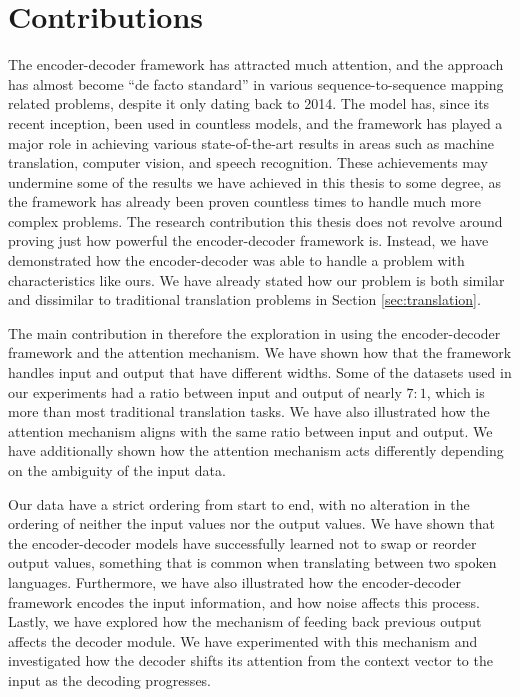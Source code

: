 
\section{Contributions}
\label{sec:contributions_final}
The encoder-decoder framework has attracted much attention, and the approach has almost become ``de facto standard'' in various sequence-to-sequence mapping related problems, despite it only dating back to 2014. The model has, since its recent inception, been used in countless models, and the framework has played a major role in achieving various state-of-the-art results in areas such as machine translation, computer vision, and speech recognition. These achievements may undermine some of the results we have achieved in this thesis to some degree, as the framework has already been proven countless times to handle much more complex problems. The research contribution this thesis does not revolve around proving just how powerful the encoder-decoder framework is. Instead, we have demonstrated how the encoder-decoder was able to handle a problem with characteristics like ours. We have already stated how our problem is both similar and dissimilar to traditional translation problems in Section \ref{sec:translation}.

The main contribution in therefore the exploration in using the encoder-decoder framework and the attention mechanism. We have shown how that the framework handles input and output that have different widths. Some of the datasets used in our experiments had a ratio between input and output of nearly \(7 : 1\), which is more than most traditional translation tasks. We have also illustrated how the attention mechanism aligns with the same ratio between input and output. We have additionally shown how the attention mechanism acts differently depending on the ambiguity of the input data.

Our data have a strict ordering from start to end, with no alteration in the ordering of neither the input values nor the output values. We have shown that the encoder-decoder models have successfully learned not to swap or reorder output values, something that is common when translating between two spoken languages. Furthermore, we have also illustrated how the encoder-decoder framework encodes the input information, and how noise affects this process. Lastly, we have explored how the mechanism of feeding back previous output affects the decoder module. We have experimented with this mechanism and investigated how the decoder shifts its attention from the context vector to the input as the decoding progresses.

